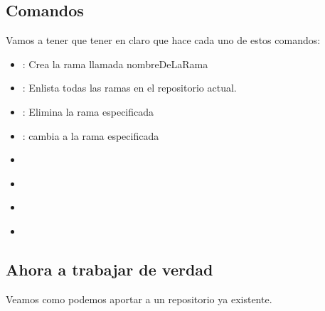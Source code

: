 \documentclass[10pt,journal,compsoc]{IEEEtran}
\begin{document}
\subsection{Comandos}
Vamos a tener que tener en claro que hace cada uno de estos comandos:
\begin{itemize}

\item \textit{\color{Blue}{git branch nombreDeLaRama}}: Crea la rama llamada nombreDeLaRama

\item \textit{\color{Blue}{git branch}}: Enlista todas las ramas en el repositorio actual.

\item \textit{\color{Blue}{git branch -d nombreDeLaRama}}: Elimina la rama especificada

\item \textit{\color{Blue}{git checkout nombreDeLaRama}}: cambia a la rama especificada

\item \textit{\color{Blue}{git remote -v}}

\item \textit{\color{Blue}{git remote add nombreQueVaATenerElRemoto url}}

\item \textit{\color{Blue}{git remote rename old new}}

\item \textit{\color{Brown}{git log --online}}
\end{itemize}

\subsection{Ahora a trabajar de verdad} 
Veamos como podemos aportar a un repositorio ya existente.
\end{document}
